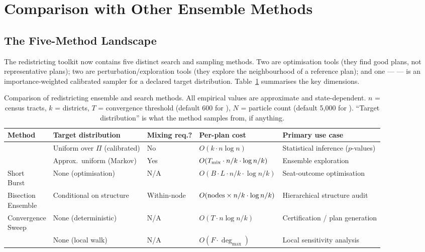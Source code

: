 \section{Comparison with Other Ensemble Methods}
\label{sec:comparison}

\subsection{The Five-Method Landscape}

The redistricting toolkit now contains five distinct search and sampling
methods.
Two are optimisation tools (they find good plans, not representative plans);
two are perturbation/exploration tools (they explore the neighbourhood of a
reference plan); and one --- \smc{} --- is an importance-weighted calibrated
sampler for a declared target distribution.
Table~\ref{tab:comparison} summarises the key dimensions.

\begin{table}[ht]
\centering
\caption{Comparison of redistricting ensemble and search methods.
  All empirical values are approximate and state-dependent.
  $n$ = census tracts, $k$ = districts, $T$ = convergence threshold
  (default 600 for \cs{}), $N$ = particle count (default 5{,}000 for \smc{}).
  ``Target distribution'' is what the method samples from, if anything.}
\label{tab:comparison}
\renewcommand{\arraystretch}{1.35}
\small
\begin{tabular}{@{}p{2.1cm}p{2.6cm}p{1.45cm}p{2.25cm}p{3.25cm}@{}}
\toprule
Method & Target distribution & Mixing req.? & Per-plan cost & Primary use case \\
\midrule
\smc{}
  & Uniform over $\Pi$ (calibrated)
  & No
  & $O(k \cdot n \log n)$
  & Statistical inference ($p$-values) \\
\recom{}
  & Approx.\ uniform (Markov)
  & Yes
  & $O(T_{\rm mix} \cdot n/k \cdot \log n/k)$
  & Ensemble exploration \\
\shortstack[l]{Short\\Burst}
  & None (optimisation)
  & N/A
  & $O(B \cdot L \cdot n/k \cdot \log n/k)$
  & Seat-outcome optimisation \\
\shortstack[l]{Bisection\\Ensemble}
  & Conditional on structure
  & Within-node
  & $O({\rm nodes} \times n/k \cdot \log n/k)$
  & Hierarchical structure audit \\
\shortstack[l]{Convergence\\Sweep}
  & None (deterministic)
  & N/A
  & $O(T \cdot n \log n / k)$
  & Certification / plan generation \\
\flip{}
  & None (local walk)
  & N/A
  & $O(F \cdot \deg_{\max})$
  & Local sensitivity analysis \\
\bottomrule
\end{tabular}
\end{table}

